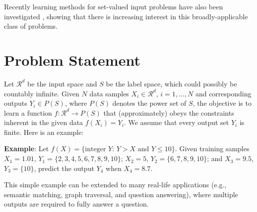 \documentclass[letterpaper]{article} %
\begin{document}
Recently learning methods for set-valued input problems have also been investigated \cite{zaheer2017deep}, showing that there is increasing interest in this broadly-applicable class of problems.


\section{Problem Statement}

Let $\mathcal{R}^d$ be the input space and $S$ be the label space, which could possibly be countably infinite. Given $N$ data samples $X_i \in \mathcal{R}^d$, $i = 1, \ldots, N$ and corresponding outputs $Y_i \in P(S)$, where $P(S)$ denotes the power set of $S$, the objective is to learn a function $f: \mathcal{R}^d \to P(S)$ that (approximately) obeys the constraints inherent in the given data $f(X_i)=Y_i$. We assume that every output set $Y_i$ is finite. Here is an example:

\textbf{Example}: Let $f(X)=\{ \text{integer } Y : \, Y > X \text{ and } Y \le 10\}$. Given training samples $X_1=1.01$, $Y_1=\{2,3,4,5,6,7,8,9,10\}$; $X_2=5$, $Y_2=\{6,7,8,9,10\}$; and $X_3=9.5$, $Y_3=\{10\}$, predict the output $Y_4$ when $X_4=8.7$.




This simple example can be extended to many real-life applications (e.g., semantic matching, graph traversal, and question answering), where multiple outputs are required to fully answer a question. 
\end{document}
